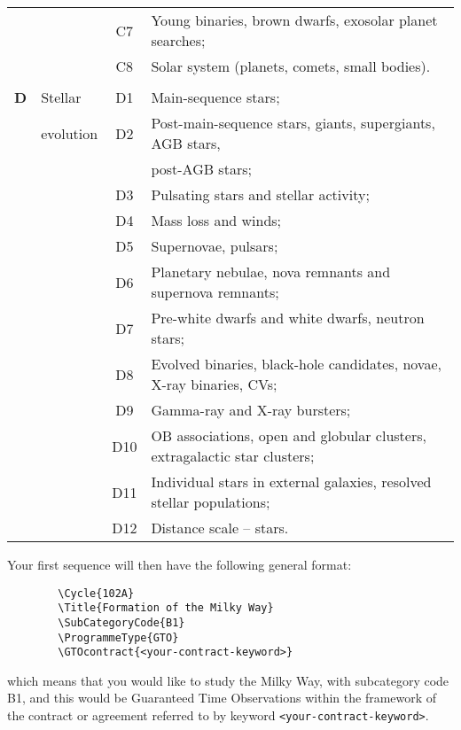 \documentclass{article}
\begin{document}
\begin{table}[p]
{\begin{center}
\begin{tabular}{llcl}
       &      & C7 & Young binaries, brown dwarfs, exosolar planet searches;\\ 
       &      & C8 & Solar system (planets, comets, small bodies). \\[4pt]  
\hline
& & & \\[-6pt]
{\bf D}& Stellar   & D1 & Main-sequence stars; \\
       & evolution & D2 & Post-main-sequence stars, giants, supergiants, AGB stars, \\
       &           &    & post-AGB stars; \\
       &           & D3 & Pulsating stars and stellar activity; \\
       &           & D4 & Mass loss and winds; \\
       &           & D5 & Supernovae, pulsars; \\
       &           & D6 & Planetary nebulae, nova remnants and supernova remnants; \\
       &           & D7 & Pre-white dwarfs and white dwarfs, neutron stars; \\ 
       &           & D8 & Evolved binaries, black-hole candidates, novae, X-ray binaries, CVs; \\
       &           & D9 & Gamma-ray and X-ray bursters; \\
       &           & D10& OB associations, open and globular clusters, extragalactic star clusters; \\
       &           & D11& Individual stars in external galaxies, resolved stellar populations;\\
       &           & D12& Distance scale -- stars.\\[4pt]
\hline
\end{tabular}
\end{center}
}
\end{table}

Your first sequence will then have the following general format:
\begin{verbatim}
        \Cycle{102A}
        \Title{Formation of the Milky Way}
        \SubCategoryCode{B1}
        \ProgrammeType{GTO}
        \GTOcontract{<your-contract-keyword>}
\end{verbatim}
\noindent which means that you would like to study the Milky Way, with subcategory code B1, and this would be Guaranteed Time
Observations within the framework of the contract or agreement
referred to by keyword \verb|<your-contract-keyword>|.
\end{document}
